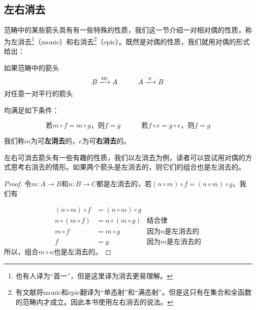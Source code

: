 \documentclass{article}
\begin{document}
\subsection{左右消去}

范畴中的某些箭头具有有一些特殊的性质，我们这一节介绍一对相对偶的性质，称为左消去\footnote{也有人译为“首一”，但是这里译为消去更易理解。}（monic）和右消去\footnote{有文献将monic和epic翻译为“单态射”和“满态射”。但是这只有在集合和全函数的范畴内才成立。因此本书使用左右消去的说法。}（epic）。既然是对偶的性质，我们就用对偶的形式给出：

\begin{definition}
如果范畴中的箭头
\[
B \arrowto{m} A \quad \quad \quad A \arrowto{e} B
\]
对任意一对平行的箭头

\begin{center}
\end{center}

均满足如下条件：

\[
\text{若} m \circ f = m \circ g \text{，则}f = g \quad \quad \quad
\text{若} f \circ e = g \circ e \text{，则}f = g
\]

我们称$m$为可\textbf{左消去}的，$e$为可\textbf{右消去}的。
\end{definition}

左右可消去箭头有一些有趣的性质，我们以左消去为例，读者可以尝试用对偶的方式思考右消去的情形。如果两个箭头是左消去的，则它们的组合也是左消去的。

\begin{proof}
令$m: A \to B$和$n: B \to C$都是左消去的，若$(n \circ m) \circ f = (n \circ m) \circ g$，我们有

\[
\begin{array}{rll}
(n \circ m) \circ f & = (n \circ m) \circ g & \\
n \circ (m \circ f) & = n \circ (m \circ g) & \text{结合律} \\
m \circ f &= m \circ g & \text{因为$n$是左消去的} \\
f & = g & \text{因为$m$是左消去的}
\end{array}
\]
所以，组合$m \circ n$也是左消去的。
\end{proof}
\end{document}
